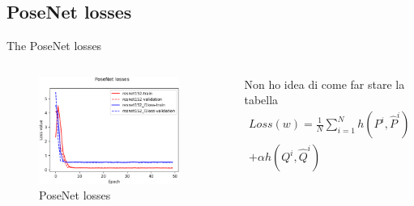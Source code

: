 \documentclass[
    center,
]{beamer}
\begin{document}
\subsection{PoseNet losses}
\begin{frame}{The PoseNet losses}
    \begin{columns}
    \begin{figure}
        \centering
        \includegraphics[width=0.9\textwidth]{../imgs/posenet_losses.png}
        \caption{PoseNet losses}
    \end{figure}

    Non ho idea di come far stare la tabella
    \begin{multline}
    Loss(w) = \frac{1}{N} \sum\limits_{i=1}^N h(P^i, \hat{P}^i) \\
    + \alpha h(Q^i, \hat{Q}^i)
    \end{multline}
    \end{columns}
\end{frame}
\end{document}
